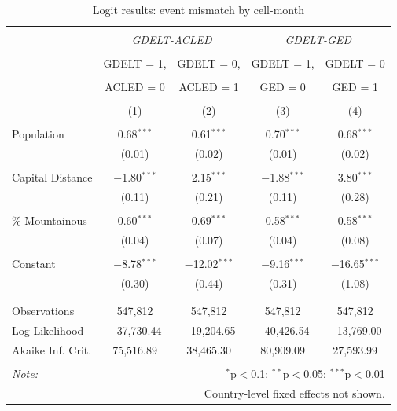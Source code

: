 \documentclass[hidelinks]{article}
\begin{document}
\begin{table}[!htbp] \centering 
  \caption{} 
  \label{} 
\begin{tabular}{@{\extracolsep{5pt}}lcccc} 
\\[-1.8ex]\hline 
\hline \\[-1.8ex] 
 & \multicolumn{2}{c}{\textit{GDELT-ACLED}} & \multicolumn{2}{c}{\textit{GDELT-GED}}\\ 
\cline{2-5} 
\\[-1.8ex] & GDELT = 1, & GDELT = 0, & GDELT = 1, & GDELT = 0 \\ 
\\[-2.8ex] & ACLED = 0 & ACLED = 1 & GED = 0 & GED = 1 \\ 
\\[-1.8ex] & (1) & (2) & (3) & (4)\\ 
\hline \\[-1.8ex] 
 Population & 0.68$^{***}$ & 0.61$^{***}$ & 0.70$^{***}$ & 0.68$^{***}$ \\ 
  & (0.01) & (0.02) & (0.01) & (0.02) \\ 
  & & & & \\ 
 Capital Distance & $-$1.80$^{***}$ & 2.15$^{***}$ & $-$1.88$^{***}$ & 3.80$^{***}$ \\ 
  & (0.11) & (0.21) & (0.11) & (0.28) \\ 
  & & & & \\ 
 \% Mountainous & 0.60$^{***}$ & 0.69$^{***}$ & 0.58$^{***}$ & 0.58$^{***}$ \\ 
  & (0.04) & (0.07) & (0.04) & (0.08) \\ 
  & & & & \\ 
 Constant & $-$8.78$^{***}$ & $-$12.02$^{***}$ & $-$9.16$^{***}$ & $-$16.65$^{***}$ \\ 
  & (0.30) & (0.44) & (0.31) & (1.08) \\ 
  & & & & \\ 
\hline \\[-1.8ex] 
Observations & 547,812 & 547,812 & 547,812 & 547,812 \\ 
Log Likelihood & $-$37,730.44 & $-$19,204.65 & $-$40,426.54 & $-$13,769.00 \\ 
Akaike Inf. Crit. & 75,516.89 & 38,465.30 & 80,909.09 & 27,593.99 \\ 
\hline 
\hline \\[-1.8ex] 
\textit{Note:}  & \multicolumn{4}{r}{$^{*}$p$<$0.1; $^{**}$p$<$0.05; $^{***}$p$<$0.01} \\ 
			& \multicolumn{4}{r}{Country-level fixed effects not shown.}
\normalsize 
\end{tabular} 
\caption{Logit results: event mismatch by cell-month}
\end{table} 
\end{document}

